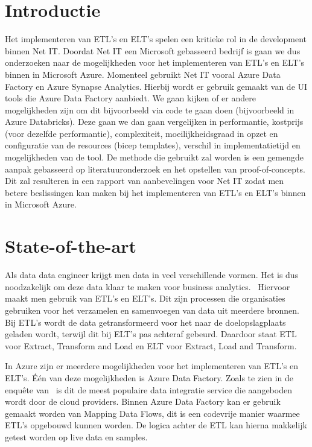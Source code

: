 
\section{Introductie}%
\label{sec:introductie}

Het implementeren van ETL's en ELT's spelen een kritieke rol in de development binnen Net IT. Doordat Net IT een Microsoft gebasseerd bedrijf is gaan we dus onderzoeken naar de mogelijkheden voor het implementeren van ETL's en ELT's binnen in Microsoft Azure. Momenteel gebruikt Net IT vooral Azure Data Factory en Azure Synapse Analytics. Hierbij wordt er gebruik gemaakt van de UI tools die Azure Data Factory aanbiedt. We gaan kijken of er andere mogelijkheden zijn om dit bijvoorbeeld via code te gaan doen (bijvoorbeeld in Azure Databricks). Deze gaan we dan gaan vergelijken in performantie, kostprijs (voor dezelfde performantie), complexiteit, moeilijkheidsgraad in opzet en configuratie van de resources (bicep templates), verschil in implementatietijd en mogelijkheden van de tool. De methode die gebruikt zal worden is een gemengde aanpak gebasseerd op literatuuronderzoek en het opstellen van proof-of-concepts. Dit zal resulteren in een rapport van aanbevelingen voor Net IT zodat men betere beslissingen kan maken bij het implementeren van ETL's en ELT's binnen in Microsoft Azure.

\section{State-of-the-art}%
\label{sec:state-of-the-art}

Als data data engineer krijgt men data in veel verschillende vormen. Het is dus noodzakelijk om deze data klaar te maken voor business analytics.~\autocite{Kromer2022} Hiervoor maakt men gebruik van ETL's en ELT's. Dit zijn processen die organisaties gebruiken voor het verzamelen en samenvoegen van data uit meerdere bronnen. Bij ETL's wordt de data getransformeerd voor het naar de doelopslagplaats geladen wordt, terwijl dit bij ELT's pas achteraf gebeurd. Daardoor staat ETL voor Extract, Transform and Load en ELT voor Extract, Load and Transform.~\autocite{Bartley2023} 

In Azure zijn er meerdere mogelijkheden voor het implementeren van ETL's en ELT's. Één van deze mogelijkheden is Azure Data Factory. Zoals te zien in de enquête van~\textcite{Sreemathy2021} is dit de meest populaire data integratie service die aangeboden wordt door de cloud providers. Binnen Azure Data Factory kan er gebruik gemaakt worden van Mapping Data Flows, dit is een codevrije manier waarmee ETL's opgebouwd kunnen worden. De logica achter de ETL kan hierna makkelijk getest worden op live data en samples.~\autocite{Kromer2022a} 

